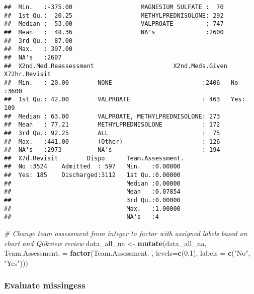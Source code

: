 \documentclass[]{article}
\newenvironment{Shaded}{\begin{snugshade}}{\end{snugshade}}
\newcommand{\KeywordTok}[1]{\textcolor[rgb]{0.13,0.29,0.53}{\textbf{#1}}}
\newcommand{\DataTypeTok}[1]{\textcolor[rgb]{0.13,0.29,0.53}{#1}}
\newcommand{\DecValTok}[1]{\textcolor[rgb]{0.00,0.00,0.81}{#1}}
\newcommand{\StringTok}[1]{\textcolor[rgb]{0.31,0.60,0.02}{#1}}
\newcommand{\CommentTok}[1]{\textcolor[rgb]{0.56,0.35,0.01}{\textit{#1}}}
\newcommand{\NormalTok}[1]{#1}
\begin{document}
\begin{verbatim}
##  Min.   :-375.00                   MAGNESIUM SULFATE :  70     
##  1st Qu.:  20.25                   METHYLPREDNISOLONE: 292     
##  Median :  53.00                   VALPROATE         : 747     
##  Mean   :  48.36                   NA's              :2600     
##  3rd Qu.:  87.00                                               
##  Max.   : 397.00                                               
##  NA's   :2607                                                  
##  X2nd.Med.Reassessment                      X2nd.Meds.Given X72hr.Revisit
##  Min.   : 20.00        NONE                         :2406   No :3600     
##  1st Qu.: 42.00        VALPROATE                    : 463   Yes: 109     
##  Median : 63.00        VALPROATE, METHYLPREDNISOLONE: 273                
##  Mean   : 77.21        METHYLPREDNISOLONE           : 172                
##  3rd Qu.: 92.25        ALL                          :  75                
##  Max.   :441.00        (Other)                      : 126                
##  NA's   :2973          NA's                         : 194                
##  X7d.Revisit        Dispo      Team.Assessment. 
##  No :3524    Admitted  : 597   Min.   :0.00000  
##  Yes: 185    Discharged:3112   1st Qu.:0.00000  
##                                Median :0.00000  
##                                Mean   :0.07854  
##                                3rd Qu.:0.00000  
##                                Max.   :1.00000  
##                                NA's   :4
\end{verbatim}

\begin{Shaded}
\begin{Highlighting}[]
\CommentTok{# Change team assessment from integer to factor with assigned labels based on chart and Qlikview review}
\NormalTok{data_all_na <-}\StringTok{ }\KeywordTok{mutate}\NormalTok{(data_all_na, }\DataTypeTok{Team.Assessment. =} \KeywordTok{factor}\NormalTok{(Team.Assessment. , }\DataTypeTok{levels=}\KeywordTok{c}\NormalTok{(}\DecValTok{0}\NormalTok{,}\DecValTok{1}\NormalTok{), }\DataTypeTok{labels =} \KeywordTok{c}\NormalTok{(}\StringTok{"No"}\NormalTok{, }\StringTok{"Yes"}\NormalTok{)))}
\end{Highlighting}
\end{Shaded}

\subsubsection{Evaluate missingess}\label{evaluate-missingess}
\end{document}
